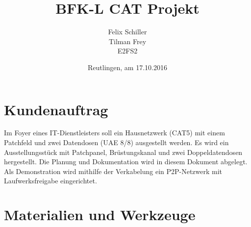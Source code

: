 \documentclass[
a4paper,     %
 headsepline, %
11pt         %
]{scrartcl}  %
\title{BFK-L CAT Projekt}
\author{Felix Schiller \\ Tilman Frey \\ E2FS2}
\date{Reutlingen, am 17.10.2016}
\begin{document}

\maketitle

\newpage
\tableofcontents



\newpage


\section{Kundenauftrag}
Im Foyer eines IT-Dienstleisters soll ein Hausnetzwerk (CAT5) mit einem Patchfeld und zwei Datendosen (UAE 8/8) ausgestellt werden.  
Es wird ein Ausstellungsstück mit Patchpanel, Brüstungskanal und zwei Doppeldatendosen hergestellt. 
Die Planung und Dokumentation wird in diesem Dokument abgelegt.
Als Demonstration wird mithilfe der Verkabelung ein P2P-Netzwerk mit Laufwerksfreigabe eingerichtet.


\section{Materialien und Werkzeuge}
\end{document}
